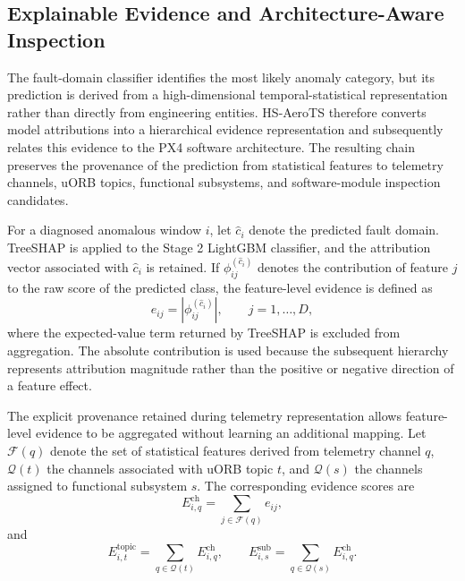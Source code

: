 \subsection{Explainable Evidence and Architecture-Aware Inspection}
\label{sec:shap_evidence}
\label{sec:module_ranking}

The fault-domain classifier identifies the most likely anomaly category, but its prediction is derived from a high-dimensional temporal-statistical representation rather than directly from engineering entities. HS-AeroTS therefore converts model attributions into a hierarchical evidence representation and subsequently relates this evidence to the PX4 software architecture. The resulting chain preserves the provenance of the prediction from statistical features to telemetry channels, uORB topics, functional subsystems, and software-module inspection candidates.

For a diagnosed anomalous window $i$, let $\hat{c}_i$ denote the predicted fault domain. TreeSHAP is applied to the Stage 2 LightGBM classifier, and the attribution vector associated with $\hat{c}_i$ is retained. If $\phi^{(\hat{c}_i)}_{ij}$ denotes the contribution of feature $j$ to the raw score of the predicted class, the feature-level evidence is defined as
\begin{equation}
e_{ij}
=
\left|\phi^{(\hat{c}_i)}_{ij}\right|,
\qquad
j=1,\ldots,D,
\label{eq:feature_evidence}
\end{equation}
where the expected-value term returned by TreeSHAP is excluded from aggregation. The absolute contribution is used because the subsequent hierarchy represents attribution magnitude rather than the positive or negative direction of a feature effect.

The explicit provenance retained during telemetry representation allows feature-level evidence to be aggregated without learning an additional mapping. Let $\mathcal{F}(q)$ denote the set of statistical features derived from telemetry channel $q$, $\mathcal{Q}(t)$ the channels associated with uORB topic $t$, and $\mathcal{Q}(s)$ the channels assigned to functional subsystem $s$. The corresponding evidence scores are
\begin{equation}
E^{\mathrm{ch}}_{i,q}
=
\sum_{j\in\mathcal{F}(q)} e_{ij},
\label{eq:channel_evidence}
\end{equation}
and
\begin{equation}
E^{\mathrm{topic}}_{i,t}
=
\sum_{q\in\mathcal{Q}(t)}E^{\mathrm{ch}}_{i,q},
\qquad
E^{\mathrm{sub}}_{i,s}
=
\sum_{q\in\mathcal{Q}(s)}E^{\mathrm{ch}}_{i,q}.
\label{eq:topic_subsystem_evidence}
\end{equation}

